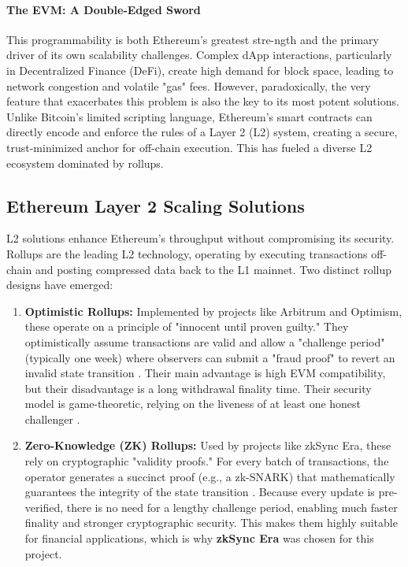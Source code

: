\documentclass{DESSThesis}
\begin{document}
\paragraph{The EVM: A Double-Edged Sword}
This programmability is both Ethereum's greatest stre-ngth and the primary driver of its own scalability challenges. Complex dApp interactions, particularly in Decentralized Finance (DeFi), create high demand for block space, leading to network congestion and volatile "gas" fees. However, paradoxically, the very feature that exacerbates this problem is also the key to its most potent solutions. Unlike Bitcoin's limited scripting language, Ethereum's smart contracts can directly encode and enforce the rules of a Layer 2 (L2) system, creating a secure, trust-minimized anchor for off-chain execution. This has fueled a diverse L2 ecosystem dominated by rollups.

\subsection{Ethereum Layer 2 Scaling Solutions}
\label{subsec:ethereum_l2_solutions}
L2 solutions enhance Ethereum's throughput without compromising its security. Rollups are the leading L2 technology, operating by executing transactions off-chain and posting compressed data back to the L1 mainnet. Two distinct rollup designs have emerged:

\begin{enumerate}
    \item \textbf{Optimistic Rollups:} Implemented by projects like Arbitrum and Optimism, these operate on a principle of "innocent until proven guilty." They optimistically assume transactions are valid and allow a "challenge period" (typically one week) where observers can submit a "fraud proof" to revert an invalid state transition \cite{noauthor_optimistic_nodate}. Their main advantage is high EVM compatibility, but their disadvantage is a long withdrawal finality time. Their security model is game-theoretic, relying on the liveness of at least one honest challenger \cite{gangwal_survey_2022}.

    \item \textbf{Zero-Knowledge (ZK) Rollups:} Used by projects like zkSync Era, these rely on cryptographic "validity proofs." For every batch of transactions, the operator generates a succinct proof (e.g., a zk-SNARK) that mathematically guarantees the integrity of the state transition \cite{chaliasos_analyzing_2024}. Because every update is pre-verified, there is no need for a lengthy challenge period, enabling much faster finality and stronger cryptographic security. This makes them highly suitable for financial applications, which is why \textbf{zkSync Era} was chosen for this project.
\end{enumerate}
\end{document}
